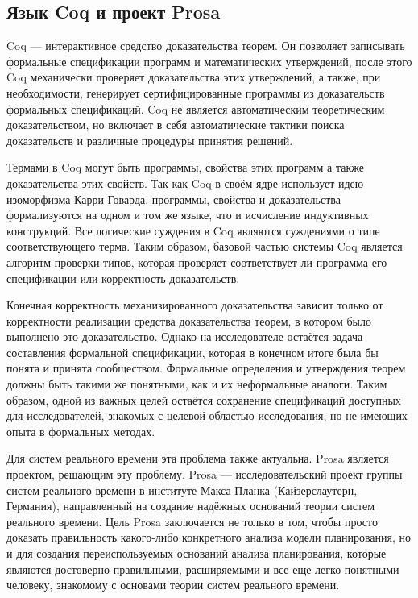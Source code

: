 \documentclass[14pt]{matmex-diploma-custom}
\begin{document}
\subsection{Язык Coq и проект Prosa}


Coq --- интерактивное средство доказательства теорем. Он позволяет записывать 
  формальные спецификации программ и математических утверждений, после этого Coq механически 
  проверяет доказательства этих утверждений, а также, при необходимости, генерирует сертифицированные 
  программы из доказательств формальных спецификаций. Coq не является автоматическим 
  теоретическим доказательством, но включает в себя автоматические
  тактики поиска доказательств и различные процедуры принятия решений. 
 
Термами в Coq могут быть программы, свойства этих программ 
  а также доказательства этих свойств. Так как Coq в своём ядре использует 
  идею изоморфизма Карри-Говарда, программы, свойства и доказательства формализуются на 
  одном и том же языке, что и исчисление индуктивных конструкций. Все логические суждения 
  в Coq являются суждениями о типе 
  соответствующего терма. Таким образом, базовой частью системы Coq является алгоритм 
  проверки типов, которая проверяет соответствует ли программа его спецификации 
  или корректность доказательств. 

Конечная корректность механизированного доказательства зависит только от корректности 
  реализации средства доказательства теорем, в котором было выполнено это доказательство. 
  Однако на исследователе остаётся задача составления 
  формальной спецификации, которая в конечном итоге была бы понята и принята сообществом. 
  Формальные определения и утверждения теорем должны быть такими же понятными, 
  как и их неформальные аналоги. Таким образом, одной из важных целей остаётся сохранение 
  спецификаций доступных для исследователей, знакомых с целевой областью исследования, но не 
  имеющих опыта в формальных методах. 

Для систем реального времени эта проблема также актуальна. Prosa является проектом, 
  решающим эту проблему. Prosa --- исследовательский проект группы 
  систем реального времени в институте Макса Планка (Кайзерслаутерн, Германия), 
  направленный на создание надёжных оснований теории систем реального времени. 
  Цель Prosa заключается не только в том, чтобы просто доказать правильность какого-либо 
  конкретного анализа модели планирования, но и для создания переиспользуемых оснований 
  анализа планирования, которые являются достоверно правильными, расширяемыми и 
  все еще легко понятными человеку, знакомому с основами теории систем реального времени.
\end{document}
